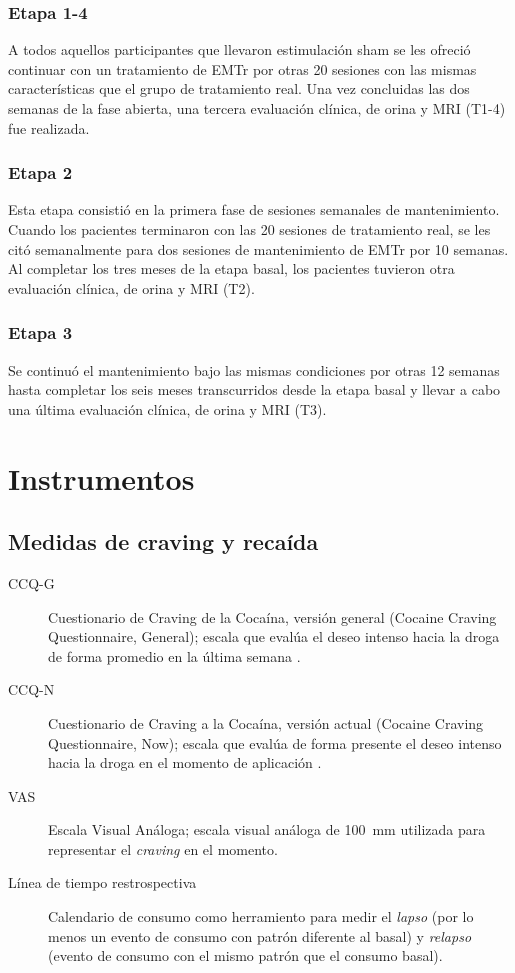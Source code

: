 \subsubsection{Etapa 1-4}
A todos aquellos participantes que llevaron estimulación sham se les ofreció continuar con un tratamiento de EMTr por otras 20 sesiones con las mismas características que el grupo de tratamiento real. Una vez concluidas las dos semanas de la fase abierta, una tercera evaluación clínica, de orina y MRI (T1-4) fue realizada.

\subsubsection{Etapa 2}
Esta etapa consistió en la primera fase de sesiones semanales de mantenimiento. Cuando los pacientes terminaron con las 20 sesiones de tratamiento real, se les citó semanalmente para dos sesiones de mantenimiento de EMTr por 10 semanas. Al completar los tres meses de la etapa basal, los pacientes tuvieron otra evaluación clínica, de orina y MRI (T2).

\subsubsection{Etapa 3}
Se continuó el mantenimiento bajo las mismas condiciones por otras 12 semanas hasta completar los seis meses transcurridos desde la etapa basal y llevar a cabo una última evaluación clínica, de orina y MRI (T3).

\section{Instrumentos}
\subsection{Medidas de craving y recaída}
\begin{description}
    \item[CCQ-G] Cuestionario de Craving de la Cocaína, versión general (Cocaine Craving Questionnaire, General); escala que evalúa el deseo intenso hacia la droga de forma promedio en la última semana \parencite{Tiffany1993}.
    \item[CCQ-N] Cuestionario de Craving a la Cocaína, versión actual (Cocaine Craving Questionnaire, Now); escala que evalúa de forma presente el deseo intenso hacia la droga en el momento de aplicación \parencite{Tiffany1993}.
    \item[VAS] Escala Visual Análoga; escala visual análoga de \SI{100}{\milli\meter} utilizada para representar el \textit{craving} en el momento.
    \item[Línea de tiempo restrospectiva] Calendario de consumo como herramiento para medir el \emph{lapso} (por lo menos un evento de consumo con patrón diferente al basal) y \emph{relapso} (evento de consumo con el mismo patrón que el consumo basal).
\end{description}
